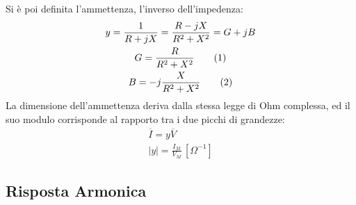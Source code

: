 \documentclass{article}
\newcommand{\tageq}{\tag{\stepcounter{equation}\theequation}}
\numberwithin{equation}{subsection}
\begin{document}
Si è poi definita l'ammettenza, l'inverso dell'impedenza:
\begin{gather*}
    y=\displaystyle\frac{1}{R+jX}=\frac{R-jX}{R^2+X^2}=G+jB\\
    G=\displaystyle\frac{R}{R^2+X^2}\tageq\\
    B=-j\displaystyle\frac{X}{R^2+X^2}\tageq
\end{gather*}
La dimensione dell'ammettenza deriva dalla stessa legge di Ohm complessa, ed il suo modulo corrisponde al rapporto tra i due picchi di grandezze:
\begin{gather*}
    \overline{I}=y\overline{V}\\
    |y|=\displaystyle\frac{I_M}{V_M}\,[\Omega^{-1}]
\end{gather*}

\subsection{Risposta Armonica}
\label{sec:risposta-armonica}
\end{document}
